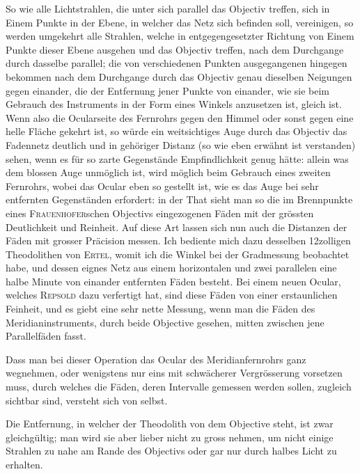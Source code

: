 So wie alle Lichtstrahlen, die unter sich parallel das Objectiv treffen, sich in Einem Punkte in der
Ebene, in welcher das Netz sich befinden soll, vereinigen, so werden umgekehrt alle Strahlen, welche
in entgegengesetzter Richtung von Einem Punkte dieser Ebene ausgehen und das Objectiv treffen, nach
dem Durchgange durch dasselbe parallel; die von verschiedenen Punkten ausgegangenen hingegen
bekommen nach dem Durchgange durch das Objectiv genau dieselben Neigungen gegen einander, die der
Entfernung jener Punkte von einander, wie sie beim Gebrauch des Instruments in der Form eines
Winkels anzusetzen ist, gleich ist. Wenn also die Ocularseite des Fernrohrs gegen den Himmel oder
sonst gegen eine helle Fläche gekehrt ist, so würde ein weitsichtiges Auge durch das Objectiv das
Fadennetz deutlich und in gehöriger Distanz (so wie eben erwähnt ist verstanden) sehen, wenn es für
so zarte Gegenstände Empfindlichkeit genug hätte: allein was dem blossen Auge unmöglich ist, wird
möglich beim Gebrauch eines zweiten Fernrohrs, wobei das Ocular eben so gestellt ist, wie es das Auge
bei sehr entfernten Gegenständen erfordert: in der That sieht man so die im Brennpunkte eines
\textsc{Frauenhofer}schen Objectivs eingezogenen Fäden mit der grössten Deutlichkeit und Reinheit. 
Auf diese Art lassen sich nun auch die Distanzen der Fäden mit grosser Präcision messen. Ich bediente
mich dazu desselben 12zolligen Theodolithen von \textsc{Ertel}, womit ich die Winkel bei der
Gradmessung beobachtet habe, und dessen eignes Netz aus einem horizontalen und zwei parallelen eine
halbe Minute von einander entfernten Fäden besteht. Bei einem neuen Ocular, welches \textsc{Repsold}
dazu verfertigt hat, sind diese Fäden von einer erstaunlichen Feinheit, und es giebt eine sehr nette
Messung, wenn man die Fäden des Meridianinstruments, durch beide Objective gesehen, mitten zwischen
jene Parallelfäden fasst.

Dass man bei dieser Operation das Ocular des Meridianfernrohrs ganz wegnehmen, oder wenigstens nur
eins mit schwächerer Vergrösserung vorsetzen muss, durch welches die Fäden, deren Intervalle gemessen
werden sollen, zugleich sichtbar sind, versteht sich von selbst.

Die Entfernung, in welcher der Theodolith von dem Objective steht, ist zwar gleichgültig; man wird
sie aber lieber nicht zu gross nehmen, um nicht einige Strahlen zu nahe am Rande des Objectivs oder
gar nur durch halbes Licht zu erhalten.

